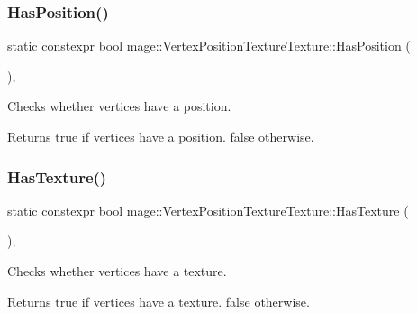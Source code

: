 \subsubsection{\texorpdfstring{Has\+Position()}{HasPosition()}}
{\footnotesize\ttfamily static constexpr bool mage\+::\+Vertex\+Position\+Texture\+Texture\+::\+Has\+Position (\begin{DoxyParamCaption}{ }\end{DoxyParamCaption})\hspace{0.3cm}{\ttfamily [static]}, {\ttfamily [noexcept]}}

Checks whether vertices have a position.

\begin{DoxyReturn}{Returns}
{\ttfamily true} if vertices have a position. {\ttfamily false} otherwise. 
\end{DoxyReturn}
\hypertarget{structmage_1_1_vertex_position_texture_texture_ad43aac95c2d0c120e2e5120553c4eadc}{}\label{structmage_1_1_vertex_position_texture_texture_ad43aac95c2d0c120e2e5120553c4eadc} 
\subsubsection{\texorpdfstring{Has\+Texture()}{HasTexture()}}
{\footnotesize\ttfamily static constexpr bool mage\+::\+Vertex\+Position\+Texture\+Texture\+::\+Has\+Texture (\begin{DoxyParamCaption}{ }\end{DoxyParamCaption})\hspace{0.3cm}{\ttfamily [static]}, {\ttfamily [noexcept]}}

Checks whether vertices have a texture.

\begin{DoxyReturn}{Returns}
{\ttfamily true} if vertices have a texture. {\ttfamily false} otherwise. 
\end{DoxyReturn}
\hypertarget{structmage_1_1_vertex_position_texture_texture_a6880fca48f99b6a3360a41f05ca7f9fc}{}\label{structmage_1_1_vertex_position_texture_texture_a6880fca48f99b6a3360a41f05ca7f9fc} 
